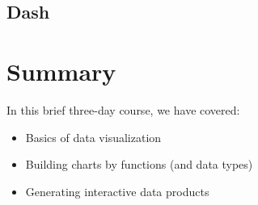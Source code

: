 \documentclass[
]{book}
\providecommand{\tightlist}{%
  \setlength{\itemsep}{0pt}\setlength{\parskip}{0pt}}
\begin{document}
\hypertarget{dash}{%
\section{Dash}\label{dash}}

\hypertarget{summary}{%
\chapter{Summary}\label{summary}}

In this brief three-day course, we have covered:

\begin{itemize}
\tightlist
\item
  Basics of data visualization
\item
  Building charts by functions (and data types)
\item
  Generating interactive data products
\end{itemize}

  
\end{document}
